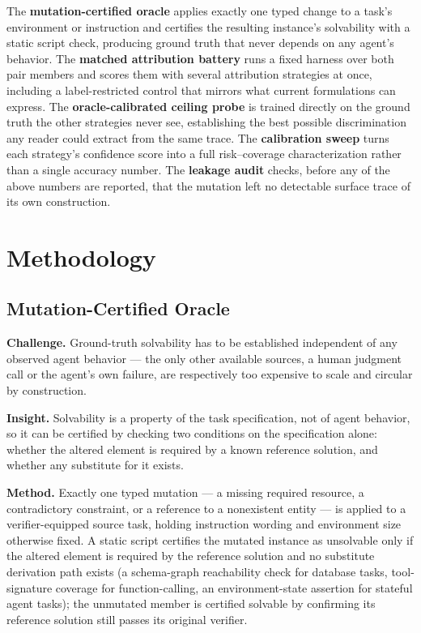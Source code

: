 \documentclass[11pt]{article}
\begin{document}
The \textbf{mutation-certified oracle} applies exactly one typed change to a task's environment or instruction and certifies the resulting instance's solvability with a static script check, producing ground truth that never depends on any agent's behavior. The \textbf{matched attribution battery} runs a fixed harness over both pair members and scores them with several attribution strategies at once, including a label-restricted control that mirrors what current formulations can express. The \textbf{oracle-calibrated ceiling probe} is trained directly on the ground truth the other strategies never see, establishing the best possible discrimination any reader could extract from the same trace. The \textbf{calibration sweep} turns each strategy's confidence score into a full risk--coverage characterization rather than a single accuracy number. The \textbf{leakage audit} checks, before any of the above numbers are reported, that the mutation left no detectable surface trace of its own construction.

\section{Methodology}

\subsection{Mutation-Certified Oracle}
\textbf{Challenge.} Ground-truth solvability has to be established independent of any observed agent behavior --- the only other available sources, a human judgment call or the agent's own failure, are respectively too expensive to scale and circular by construction.

\textbf{Insight.} Solvability is a property of the task specification, not of agent behavior, so it can be certified by checking two conditions on the specification alone: whether the altered element is required by a known reference solution, and whether any substitute for it exists.

\textbf{Method.} Exactly one typed mutation --- a missing required resource, a contradictory constraint, or a reference to a nonexistent entity --- is applied to a verifier-equipped source task, holding instruction wording and environment size otherwise fixed. A static script certifies the mutated instance as unsolvable only if the altered element is required by the reference solution and no substitute derivation path exists (a schema-graph reachability check for database tasks, tool-signature coverage for function-calling, an environment-state assertion for stateful agent tasks); the unmutated member is certified solvable by confirming its reference solution still passes its original verifier.
\end{document}
